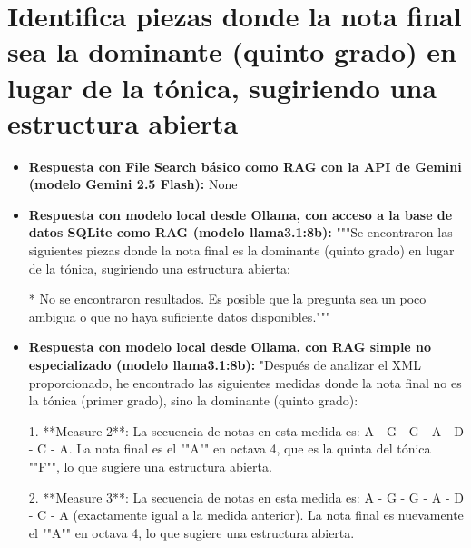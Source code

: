 \section{Identifica piezas donde la nota final sea la dominante (quinto grado) en lugar de la tónica, sugiriendo una estructura abierta}
\begin{itemize}
    \item \textbf{Respuesta con File Search básico como RAG con la API de Gemini (modelo Gemini 2.5 Flash):} None
    \item \textbf{Respuesta con modelo local desde Ollama, con acceso a la base de datos SQLite como RAG (modelo llama3.1:8b):} """Se encontraron las siguientes piezas donde la nota final es la dominante (quinto grado) en lugar de la tónica, sugiriendo una estructura abierta:

* No se encontraron resultados. Es posible que la pregunta sea un poco ambigua o que no haya suficiente datos disponibles."""
\item \textbf{Respuesta con modelo local desde Ollama, con RAG simple no especializado (modelo llama3.1:8b):} "Después de analizar el XML proporcionado, he encontrado las siguientes medidas donde la nota final no es la tónica (primer grado), sino la dominante (quinto grado):

1. **Measure 2**: La secuencia de notas en esta medida es: A - G - G - A - D - C - A.
La nota final es el ""A"" en octava 4, que es la quinta del tónica ""F"", lo que sugiere una estructura abierta.

2. **Measure 3**: La secuencia de notas en esta medida es: A - G - G - A - D - C - A (exactamente igual a la medida anterior).
La nota final es nuevamente el ""A"" en octava 4, lo que sugiere una estructura abierta.


\end{itemize}
